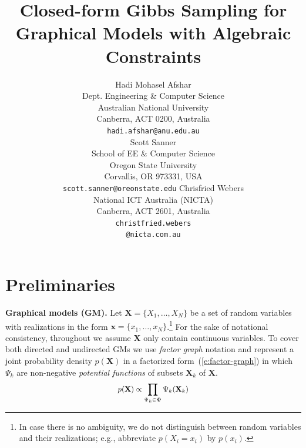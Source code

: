 \documentclass[letterpaper]{article}
\renewcommand{\vec}[1]{\mathbf{#1}}
\newcommand{\bvec}[1]{\textbf{#1}}
\newcommand{\pr}{p}
\begin{document}
%
\title{Closed-form Gibbs Sampling for Graphical Models with Algebraic Constraints}
\author{Hadi Mohasel Afshar 
\\
Dept. Engineering \& Computer Science \\
Australian National University\\
Canberra, ACT 0200, Australia\\
\texttt{hadi.afshar@anu.edu.au} \\
\And
Scott Sanner\\
School of EE \& Computer Science\\
Oregon State University\\
Corvallis, OR 973331, USA\\
\texttt{scott.sanner@oreonstate.edu}
\And
Chrisfried Webers\\
National ICT Australia (NICTA)\\
Canberra, ACT 2601, Australia\\
\texttt{christfried.webers}\\
\texttt{@nicta.com.au}
}
\maketitle







\section{Preliminaries}
\label{sect:background}
{\bf Graphical models (GM).} Let $\vec{X} = \{X_1, \ldots, X_N\}$ be a set of random variables with realizations in the form 
$\vec{x} = \{x_1, \ldots, x_N\}$.\footnote{
In case there is no ambiguity, we do not distinguish between random variables and their realizations; e.g., abbreviate $\pr(X_i \!=\! x_i)$ by $\pr(x_i)$.}
For the sake of notational consistency, 
throughout we assume $\vec{X}$ only contain continuous variables. 
To cover both directed and undirected GMs we use
\emph{factor graph} notation \cite{kschischang2001factor}
and represent a joint probability density $\pr(\vec{X})$ in a factorized form~(\ref{e:factor-graph}) 
in which  $\Psi_k$ are non-negative \emph{potential functions} 
of subsets $\bvec{X}_k$ of $\bvec{X}$. 
\begin{equation} \footnotesize
\label{e:factor-graph}
\pr(\vec{X}) \propto \prod_{\Psi_k \in \boldsymbol\Psi} \Psi_k (\vec{X}_k)
\end{equation}
\end{document}
